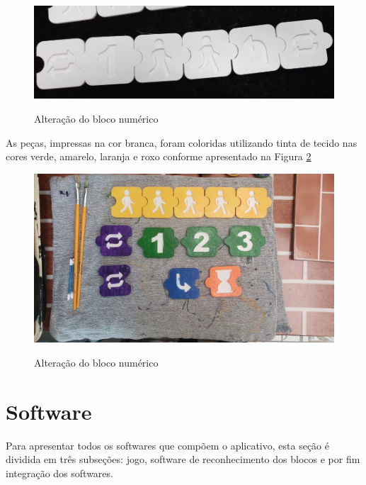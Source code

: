     \begin{figure}[H]
        \caption{Alteração do bloco numérico}
        \centering
        \includegraphics[width=\linewidth]{Imagens/Cap4/alteracao_bloco_numerico.jpg}
        \label{figura:alteracao_bloco_numerico}
    \end{figure}
    
    As peças, impressas na cor branca, foram coloridas utilizando tinta de tecido nas cores verde, amarelo, laranja e roxo conforme apresentado na Figura \ref{figura:blocos_pintados}
    
    \begin{figure}[H]
        \caption{Alteração do bloco numérico}
        \centering
        \includegraphics[width=\linewidth]{Imagens/Cap4/blocos_pintados.jpeg}
        \label{figura:blocos_pintados}
    \end{figure}

\section{Software}

Para apresentar todos os softwares que compõem o aplicativo, esta seção é dividida em três subseções: jogo, software de reconhecimento dos blocos e por fim integração dos softwares.

